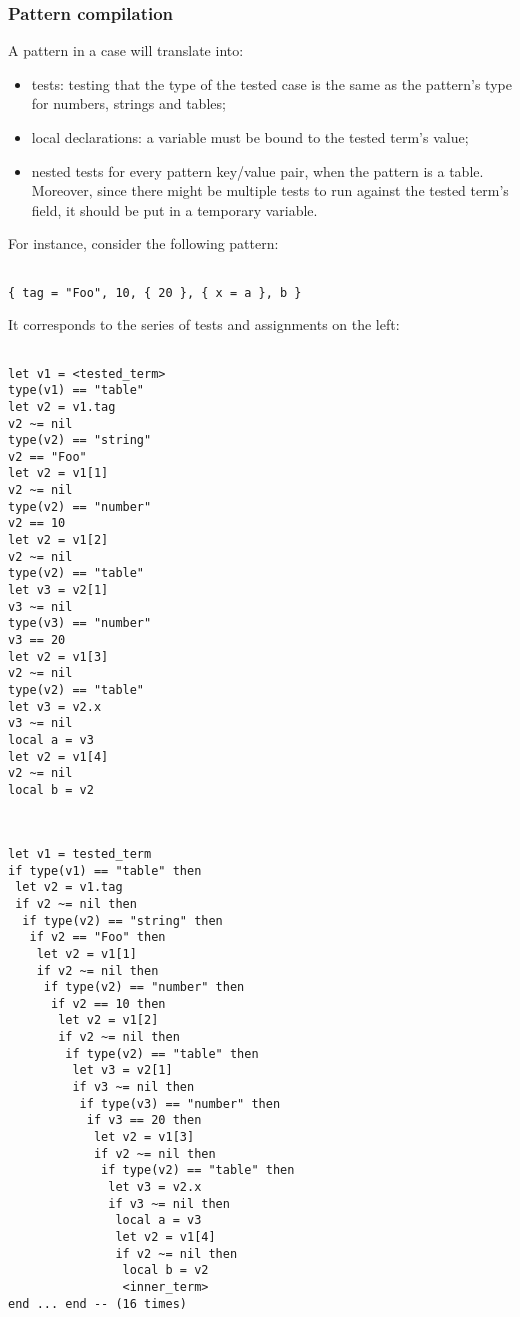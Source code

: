 \subsubsection{Pattern compilation}

A pattern in a case will translate into:
\begin{itemize}
\item tests: testing that the type of the tested case is the same as
  the pattern's type for numbers, strings and tables;
\item local declarations: a variable must be bound to the
  tested term's value;
\item nested tests for every pattern key/value pair, when the pattern
  is a table. Moreover, since there might be multiple tests to run
  against the tested term's field, it should be put in a temporary
  variable.
\end{itemize}

For instance, consider the following pattern:

\begin{Verbatim}[fontsize=\scriptsize]

{ tag = "Foo", 10, { 20 }, { x = a }, b }
\end{Verbatim}

It corresponds to the series of tests and assignments on the left:

\begin{minipage}{6cm}
\begin{Verbatim}[fontsize=\scriptsize]

let v1 = <tested_term>
type(v1) == "table"
let v2 = v1.tag
v2 ~= nil
type(v2) == "string"
v2 == "Foo"
let v2 = v1[1]
v2 ~= nil
type(v2) == "number"
v2 == 10
let v2 = v1[2]
v2 ~= nil
type(v2) == "table"
let v3 = v2[1]
v3 ~= nil
type(v3) == "number"
v3 == 20
let v2 = v1[3]
v2 ~= nil
type(v2) == "table"
let v3 = v2.x
v3 ~= nil
local a = v3
let v2 = v1[4]
v2 ~= nil
local b = v2


\end{Verbatim}
\end{minipage}
\begin{minipage}{6cm}
\begin{Verbatim}[fontsize=\scriptsize]

let v1 = tested_term
if type(v1) == "table" then
 let v2 = v1.tag
 if v2 ~= nil then
  if type(v2) == "string" then
   if v2 == "Foo" then
    let v2 = v1[1]
    if v2 ~= nil then
     if type(v2) == "number" then
      if v2 == 10 then
       let v2 = v1[2]
       if v2 ~= nil then
        if type(v2) == "table" then
         let v3 = v2[1]
         if v3 ~= nil then
          if type(v3) == "number" then
           if v3 == 20 then
            let v2 = v1[3]
            if v2 ~= nil then
             if type(v2) == "table" then
              let v3 = v2.x
              if v3 ~= nil then
               local a = v3
               let v2 = v1[4]
               if v2 ~= nil then
                local b = v2
                <inner_term>
end ... end -- (16 times)
\end{Verbatim}
\end{minipage}
~\\~\\

